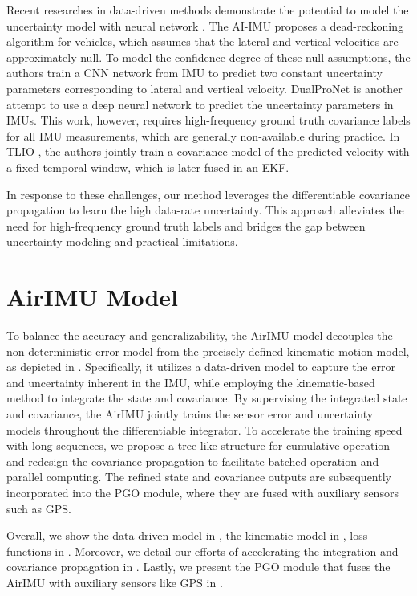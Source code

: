 Recent researches in data-driven methods demonstrate the potential to model the uncertainty model with neural network \cite{russell2021multivariate}.
The AI-IMU \cite{brossard2020ai} proposes a dead-reckoning algorithm for vehicles, which assumes that the lateral and vertical velocities are approximately null.
To model the confidence degree of these null assumptions, the authors train a CNN network from IMU to predict two constant uncertainty parameters corresponding to lateral and vertical velocity.
DualProNet \cite{solodar2023vio} is another attempt to use a deep neural network to predict the uncertainty parameters in IMUs.
This work, however, requires high-frequency ground truth covariance labels for all IMU measurements, which are generally non-available during practice.
In TLIO \cite{liu2020tlio}, the authors jointly train a covariance model of the predicted velocity with a fixed temporal window, which is later fused in an EKF. 

In response to these challenges, our method leverages the differentiable covariance propagation to learn the high data-rate uncertainty. 
This approach alleviates the need for high-frequency ground truth labels and bridges the gap between uncertainty modeling and practical limitations.

\section{AirIMU Model}

To balance the accuracy and generalizability, the AirIMU model decouples the non-deterministic error model from the precisely defined kinematic motion model, as depicted in . 
Specifically, it utilizes a data-driven model to capture the error and uncertainty inherent in the IMU, while employing the kinematic-based method to integrate the state and covariance.
By supervising the integrated state and covariance, the AirIMU jointly trains the sensor error and uncertainty models throughout the differentiable integrator.
To accelerate the training speed with long sequences, we propose a tree-like structure for cumulative operation and redesign the covariance propagation to facilitate batched operation and parallel computing.
The refined state and covariance outputs are subsequently incorporated into the PGO module, where they are fused with auxiliary sensors such as GPS.

Overall, we show the data-driven model in , the kinematic model in , loss functions in .
Moreover, we detail our efforts of accelerating the integration and covariance propagation in . Lastly, we present the PGO module that fuses the AirIMU with auxiliary sensors like GPS in .

